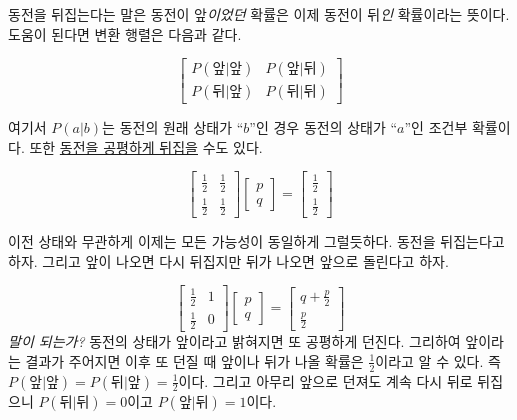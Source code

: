 \documentclass[a4paper,chapter,atbegshi,hidelinks]{oblivoir}
\begin{document}
동전을 뒤집는다는 말은 동전이 앞\emph{이었던} 확률은 이제 동전이 뒤\emph{인}
확률이라는 뜻이다. 도움이 된다면 변환 행렬은 다음과 같다.

\begin{equation}
  \begin{bmatrix}
    P(\textrm{앞}|\textrm{앞}) &P(\textrm{앞}|\textrm{뒤}) \\
    P(\textrm{뒤}|\textrm{앞}) &P(\textrm{뒤}|\textrm{뒤})
  \end{bmatrix}
\end{equation}

여기서 $P(a|b)$는 동전의 원래 상태가 ``$b$''인 경우 동전의 상태가 ``$a$''인 조건부 확률이다. 또한 \underline{동전을 공평하게 뒤집을} 수도 있다.

\begin{equation}
  \begin{bmatrix}
    \frac{1}{2} & \frac{1}{2} \\
    \frac{1}{2} & \frac{1}{2}
  \end{bmatrix}
  \begin{bmatrix}p\\q\end{bmatrix} =
  \begin{bmatrix}\frac{1}{2}\\\frac{1}{2}\end{bmatrix}
\end{equation}

이전 상태와 무관하게 이제는 모든 가능성이 동일하게 그럴듯하다. 동전을 뒤집는다고
하자. 그리고 앞이 나오면 다시 뒤집지만 뒤가 나오면 앞으로 돌린다고 하자.

\begin{equation}
  \begin{bmatrix}
    \frac{1}{2} & 1 \\ \frac{1}{2} & 0
  \end{bmatrix}
  \begin{bmatrix} p \\ q \end{bmatrix} = 
  \begin{bmatrix} q+\frac{p}{2} \\ \frac{p}{2} \end{bmatrix}
\end{equation}
\emph{말이 되는가?} 동전의 상태가 앞이라고 밝혀지면 또 공평하게 던진다.
그리하여 앞이라는 결과가 주어지면 이후 또 던질 때 앞이나 뒤가 나올 확률은
$\frac{1}{2}$이라고 알 수 있다. 즉 $P(\textrm{앞}|\textrm{앞})= P(\textrm{뒤}|
\textrm{앞})=\frac{1}{2}$이다. 그리고 아무리 앞으로 던져도 계속 다시 뒤로
뒤집으니 $P(\textrm{뒤}|\textrm{뒤})=0$이고
$P(\textrm{앞}|\textrm{뒤})=1$이다. 
\end{document}
